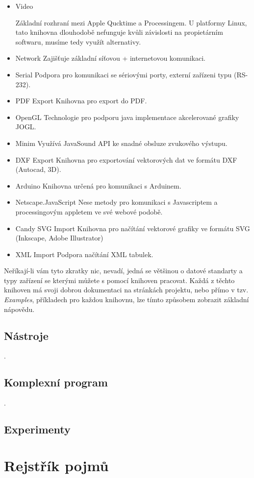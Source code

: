 \documentclass[10pt,twopage]{book}
\newcommand{\oddil}[1]{\section{#1}\label{sec:#1}}
\begin{document}
\begin{itemize}
\item
Video

Základní rozhraní mezi Apple Qucktime a Processingem. U platformy Linux, tato knihovna dlouhodobě nefunguje kvůli závislosti na propietárním softwaru, musíme tedy využít alternativy.

\item
Network
Zajišťuje základní síťovou + internetovou komunikaci. 

\item
Serial
Podpora pro komunikaci se sériovými porty, externí zařízeni typu (RS-232).

\item
PDF Export
Knihovna pro export do PDF.

\item
OpenGL
Technologie pro podporu java implementace akcelerované grafiky JOGL.

\item
Minim
Využívá JavaSound API ke snadné obsluze zvukového výstupu.

\item
DXF Export
Knihovna pro exportování vektorových dat ve formátu DXF (Autocad, 3D).

\item
Arduino
Knihovna určená pro komunikaci s Arduinem.

\item
Netscape.JavaScript
Nese metody pro komunikaci s Javascriptem a processingovým appletem ve své webové podobě.

\item
Candy SVG Import
Knihovna pro načítání vektorové grafiky ve formátu SVG (Inkscape, Adobe Illustrator)

\item
XML Import
Podpora načítání XML tabulek.
\end{itemize}

Neříkají-li vám tyto zkratky nic, nevadí, jedná se většinou o datové standarty a typy zařízení se kterými můžete s pomocí knihoven pracovat. Každá z těchto knihoven má svoji dobrou dokumentaci na stránkách projektu, nebo přímo v tzv. {\em Examples}, příkladech pro každou knihovnu, lze tímto způsobem zobrazit základní nápovědu.






\oddil{Nástroje}
.
\newpage
\oddil{Komplexní program}
.
\newpage
\oddil{Experimenty}


\chapter{Rejstřík pojmů}
\printglossaries
\printindex


\end{document}
